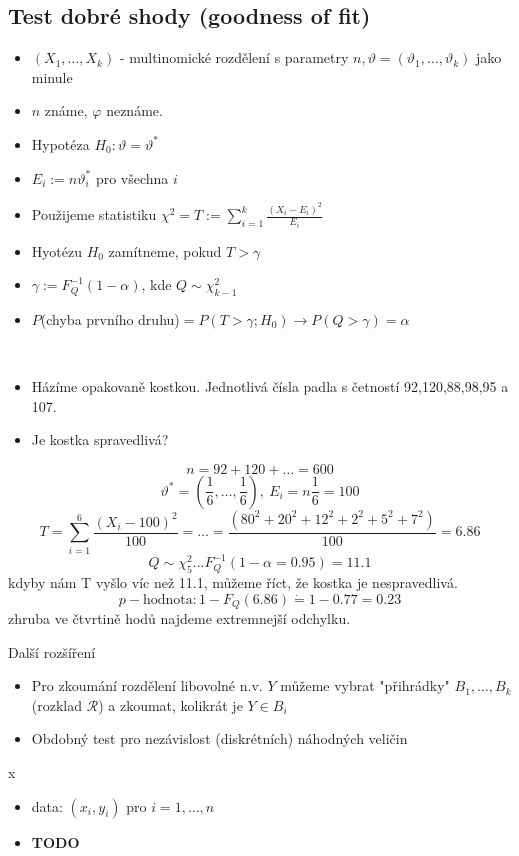 \documentclass[../main.tex]{subfiles}
\begin{document}
\subsection{Test dobré shody (goodness of fit)}
\begin{itemize}
    \item $(X_1,\dots,X_k)$ - multinomické rozdělení s parametry $n,\vartheta =
        (\vartheta_1,\dots,\vartheta_k)$ jako minule
    \item $n$ známe, $\varphi$ neznáme.
    \item Hypotéza $H_0: \vartheta = \vartheta^*$
    \item $E_i := n\vartheta^*_i$ pro všechna $i$
    \item Použijeme statistiku $\chi^2 = T:= \sum^k_{i=1} \frac{(X_i-E_i)^2}{E_i}$
    \item Hyotézu $H_0$ zamítneme, pokud $T > \gamma$
    \item $\gamma := F^{-1}_Q (1-\alpha)$, kde $Q \sim \chi^2_{k-1}$
    \item $P$(chyba prvního druhu)$ = P(T > \gamma; H_0) \rightarrow P(Q>\gamma) = \alpha$
\end{itemize}
\begin{example}\
    \begin{itemize}
        \item Házíme opakovaně kostkou. Jednotlivá čísla padla s četností 92,120,88,98,95 a 107.
        \item Je kostka spravedlivá?
    \end{itemize}
    \[ n = 92 + 120 +\dots = 600\]
    \[\vartheta^* = \left(\frac{1}{6}, \dots, \frac{1}{6}\right),\ E_i = n \frac{1}{6} = 100\]
    \[T = \sum^6_{i=1} \frac{(X_i - 100)^2}{100} = \dots = \frac{(80^2 + 20^2 +
    12^2 + 2^2 + 5^2 + 7^2)}{100} = 6.86\]
    \[Q \sim \chi^2_5 \dots F^{-1}_Q (1 - \alpha = 0.95) = 11.1\]
    kdyby nám T vyšlo víc než 11.1, můžeme říct, že kostka je nespravedlivá.
    \[p-\text{hodnota}: 1-F_Q(6.86) \dot{=} 1 - 0.77 = 0.23\]
    zhruba ve čtvrtině hodů najdeme extremnejší odchylku.
\end{example}

Další rozšíření
\begin{itemize}
    \item Pro zkoumání rozdělení libovolné n.v. $Y$ můžeme vybrat "přihrádky" $B_1,\dots,B_k$ (rozklad $\mathcal{R}$) a zkoumat, kolikrát je $Y \in B_i$
    \item Obdobný test pro nezávislost (diskrétních) náhodných veličin 
\end{itemize}

\begin{definition}
    {\color{white} x}
    \begin{itemize}
        \item data: $(x_i,y_i)$ pro $i=1,\dots,n$
        \item \textbf{TODO} 
    \end{itemize}
\end{definition}
\end{document}
